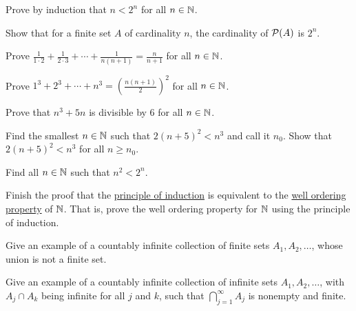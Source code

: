 \begin{exercise}
Prove by induction that $n < 2^n$ for all $n \in {\mathbb{N}}$.
\end{exercise}

\begin{exercise}
Show that for a finite set $A$ of cardinality $n$, the cardinality
of ${\mathcal{P}}(A)$ is $2^n$.
\end{exercise}

\begin{exercise}
Prove $\frac{1}{1\cdot 2} + 
\frac{1}{2\cdot 3} + \cdots + \frac{1}{n(n+1)} = \frac{n}{n+1}$
for all $n \in {\mathbb{N}}$.
\end{exercise}

\begin{exercise}
Prove $1^3 + 2^3 + \cdots + n^3 = {\left( \frac{n(n+1)}{2} \right)}^2$
for all $n \in {\mathbb{N}}$.
\end{exercise}

\begin{exercise}
Prove that $n^3 + 5n$ is divisible by $6$ for all $n \in {\mathbb{N}}$.
\end{exercise}

\begin{exercise}
Find the smallest $n \in {\mathbb{N}}$ such that $2{(n+5)}^2 < n^3$ and call it $n_0$.
Show that $2{(n+5)}^2 < n^3$ for all $n \geq n_0$.
\end{exercise}

\begin{exercise}
Find all $n \in {\mathbb{N}}$ such that $n^2 < 2^n$.
\end{exercise}

\begin{exercise}
Finish the proof that the \hyperref[induction:thm]{principle of induction}
is equivalent to the
\hyperlink{wop:link}{well ordering property} of ${\mathbb{N}}$.  That is,
prove the well ordering property for ${\mathbb{N}}$ using the principle of
induction.
\end{exercise}


\begin{exercise}
Give an example of a countably infinite collection of finite sets $A_1, A_2, \ldots$,
whose union is not a finite set.
\end{exercise}

\begin{exercise}
Give an example of a countably infinite collection of infinite sets $A_1, A_2, \ldots$,
with $A_j \cap A_k$ being infinite for all $j$ and $k$, such that
$\bigcap_{j=1}^\infty A_j$
is nonempty and finite.
\end{exercise}

